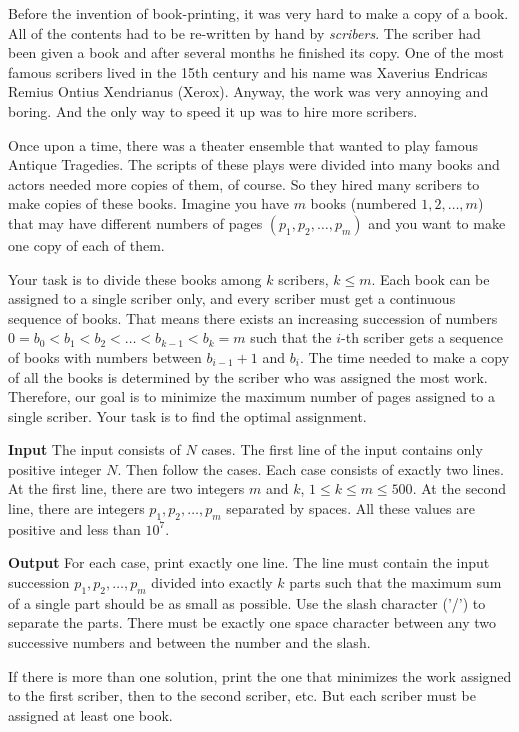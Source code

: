 \normalfont\documentclass[letterpaper,11pt]{article}
\begin{document}
Before the invention of book-printing, it was very hard to make a copy of a book. All of the contents had to be re-written by hand by \textit{scribers}. The scriber had been given a book and after several months he finished its copy. One of the most famous scribers lived in the 15th century and his name was Xaverius Endricas Remius Ontius Xendrianus (Xerox). Anyway, the work was very annoying and boring. And the only way to speed it up was to hire more scribers.

Once upon a time, there was a theater ensemble that wanted to play famous Antique Tragedies. The scripts of these plays were divided into many books and actors needed more copies of them, of course. So they hired many scribers to make copies of these books. Imagine you have $m$ books (numbered $1, 2, \ldots, m$) that may have different numbers of pages $(p_1, p_2, \ldots, p_m)$ and you want to make one copy of each of them.

Your task is to divide these books among $k$ scribers, $k \leq m$. Each book can be assigned to a single scriber only, and every scriber must get a continuous sequence of books. That means there exists an increasing succession of numbers $0 = b_0 < b_1 < b_2 < \ldots < b_{k - 1} < b_k = m$ such that the $i$-th scriber gets a sequence of books with numbers between $b_{i - 1} + 1$ and $b_i$. The time needed to make a copy of all the books is determined by the scriber who was assigned the most work. Therefore, our goal is to minimize the maximum number of pages assigned to a single scriber. Your task is to find the optimal assignment.

\textbf{Input} \newline
The input consists of $N$ cases. The first line of the input contains only positive integer $N$. Then follow the cases. Each case consists of exactly two lines. At the first line, there are two integers $m$ and $k$, $1 \leq k \leq m \leq 500$. At the second line, there are integers $p_1, p_2, \ldots, p_m$ separated by spaces. All these values are positive and less than $10^7$.

\textbf{Output} \newline
For each case, print exactly one line. The line must contain the input succession $p_1, p_2, \ldots, p_m$ divided into exactly $k$ parts such that the maximum sum of a single part should be as small as possible. Use the slash character ('/') to separate the parts. There must be exactly one space character between any two successive numbers and between the number and the slash.

If there is more than one solution, print the one that minimizes the work assigned to the first scriber, then to the second scriber, etc. But each scriber must be assigned at least one book.
\end{document}
